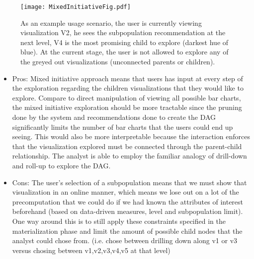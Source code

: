 \documentclass[11pt]{article}
\begin{document}
 \begin{figure}[ht!]
\texttt{[image: MixedInitiativeFig.pdf]}
\caption{As an example usage scenario, the user is currently viewing visualization V2, he sees the subpopulation recommendation at the next level, V4 is the most promising child to explore (darkest hue of blue). At the current stage, the user is not allowed to explore any of the greyed out visualizations (unconnected parents or children).}

\end{figure}
 \begin{itemize}
 \item Pros: Mixed initiative approach means that users has input at every step of the exploration regarding the children visualizations that they would like to explore. Compare to direct manipulation of viewing all possible bar charts, the mixed initiative exploration should be more tractable since the pruning done by the system and recommendations done to create the DAG significantly limits the number of bar charts that the users could end up seeing. This would also be more interpretable because the interaction enforces that the visualization explored must be connected through the parent-child relationship. The analyst is able to employ the familiar analogy of drill-down and roll-up to explore the DAG.
 \item Cons: The user's selection of a subpopulation means that we must show that visualization in an online manner, which means we lose out on a lot of the precomputation that we could do if we had known the attributes of interest beforehand (based on data-driven measures, level and subpopulation limit). One way around this is to still apply these constraints specified in the materialization phase and limit the amount of possible child nodes that the analyst could chose from. (i.e. chose between drilling down along v1 or v3 versus chosing between v1,v2,v3,v4,v5 at that level)
 \end{itemize}
\end{document}
